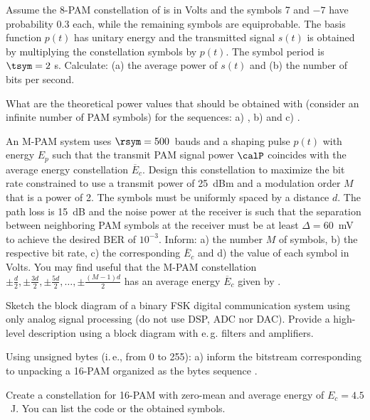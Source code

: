\begin{exercises}
\item Assume the 8-PAM constellation of  is in Volts and the symbols 7 and $-7$ have probability 0.3 each, while the remaining symbols are equiprobable. The basis function $p(t)$ has unitary energy and the transmitted signal $s(t)$ is obtained by multiplying the constellation symbols by $p(t)$. The symbol period is $\tsym = 2$ s. Calculate: (a) the average power of $s(t)$ and (b) the number of bits per second.

\item What are the theoretical power values that should be obtained with  (consider an infinite number  of PAM symbols) for the sequences: a) , b)  and c) .

\item An M-PAM system uses $\rsym=500$~bauds and a shaping pulse $p(t)$ with energy $E_p$ such that the transmit PAM signal power $\calP$ coincides with the average energy constellation $\overline E_c$. Design this constellation to maximize the bit rate constrained to use a transmit power of 25~dBm and a modulation order $M$ that is a power of 2. The symbols must be uniformly spaced by a distance $d$. The path loss is 15~dB and the noise power at the receiver is such that the separation between neighboring PAM symbols at the receiver must be at least $\Delta=60$~mV to achieve the desired BER of $10^{-3}$. Inform: a) the number $M$ of symbols, b) the respective bit rate, c) the corresponding $\overline E_c$ and d) the value of each symbol in Volts. You may find useful that the M-PAM constellation $\pm \frac{d}{2}, \pm \frac{3d}{2}, \pm \frac{5d}{2}, \ldots, \pm \frac{(M-1)d}{2}$ has an average energy $\overline E_c$ given by .

\item Sketch the block diagram of a binary FSK digital communication system using only analog signal processing (do not use DSP, ADC nor DAC). Provide a high-level description using a block diagram with e.\,g. filters and amplifiers.

\item Using unsigned bytes (i.\,e., from 0 to 255): a) inform the bitstream corresponding to unpacking a 16-PAM organized as the bytes sequence .

\item Create a constellation for 16-PAM with zero-mean and average energy of $E_c = 4.5$~J. You can list the code or the obtained symbols.


\end{exercises}
